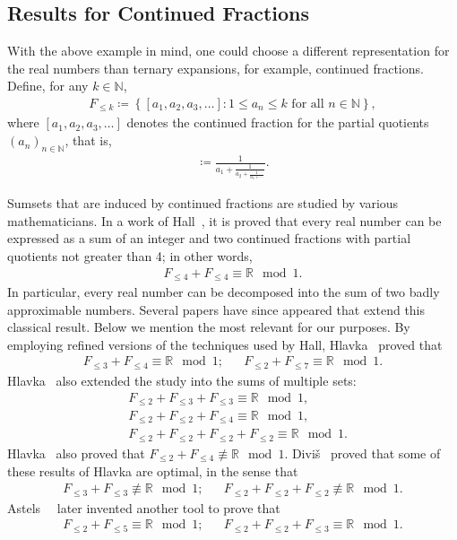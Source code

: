 \documentclass{ws-ijnt}
\begin{document}
	\subsection{Results for Continued Fractions}\label{subsectrfcf}
	With the above example in mind, one could choose a different representation for the real numbers than ternary expansions, for example, continued fractions.
	Define, for any $k\in\mathbb{N}$,
	\begin{align*}
		F_{\leq k}
		\coloneqq
		\left\{[a_1,a_2,a_3,\ldots] : 1\leq a_n \leq k \text{ for all } n\in\mathbb{N}\right\},
	\end{align*}
	where $[a_1,a_2,a_3,\ldots]$ denotes the continued fraction for the partial quotients $(a_n)_{n\in\mathbb{N}}$, that is,
	\begin{align*}
		[a_1,a_2,a_3,\ldots]
		\coloneqq\frac{1}{\displaystyle a_1+\frac{1}{\displaystyle a_2+\frac{1}{a_3+\cdots}}}.
	\end{align*}
	
	Sumsets that are induced by continued fractions are studied by various mathematicians. In a work of Hall~\cite[Theorem 3.1]{hall1947}, it is proved that every real number can be expressed as a sum of an integer and two continued fractions with partial quotients not greater than 4; in other words,
	\begin{align*}
		F_{\leq 4}+F_{\leq 4} \equiv \mathbb{R} \mod 1.
	\end{align*}
	In particular, every real number can be decomposed into the sum of two badly approximable numbers. Several papers have since appeared that extend this classical result. Below we mention the most relevant for our purposes. By employing refined versions of the techniques used by Hall, Hlavka~\cite[Theorems 6 \& 9]{Hlavka1975} proved that
	\begin{align*}
		F_{\leq 3}+F_{\leq 4} \equiv \mathbb{R} \mod 1; &&
		F_{\leq 2}+F_{\leq 7} \equiv \mathbb{R} \mod 1.
	\end{align*}
	Hlavka~\cite[Theorems 11]{Hlavka1975} also extended the study into the sums of multiple sets:
	\begin{align*}
		&F_{\leq 2}+F_{\leq 3}+F_{\leq 3} \equiv \mathbb{R} \mod 1, \\
		&F_{\leq 2}+F_{\leq 2}+F_{\leq 4} \equiv \mathbb{R} \mod 1, \\
		&F_{\leq 2}+F_{\leq 2}+F_{\leq 2}+F_{\leq 2} \equiv \mathbb{R} \mod 1.
	\end{align*}
	Hlavka~\cite{Hlavka1975} also proved that $F_{\leq 2}+F_{\leq 4} \not\equiv \mathbb{R} \mod 1$. Divi\v{s}~\cite[Theorems 1 \& 2]{divis1973} proved that some of these results of Hlavka are optimal, in the sense that
	\begin{align*}
		F_{\leq 3}+F_{\leq 3}\not\equiv \mathbb{R} \mod 1; &&
		F_{\leq 2}+F_{\leq 2}+F_{\leq 2} \not\equiv \mathbb{R} \mod 1.
	\end{align*}
	Astels~\cite[Theorem 1.1]{astels2001sums}~\cite[Theorem 1]{astels2002sums} later invented another tool to prove that
	\begin{align*}
		F_{\leq 2}+F_{\leq 5} \equiv \mathbb{R} \mod 1; &&
		F_{\leq 2}+F_{\leq 2}+F_{\leq 3} \equiv \mathbb{R} \mod 1.
	\end{align*}
	
\end{document}
